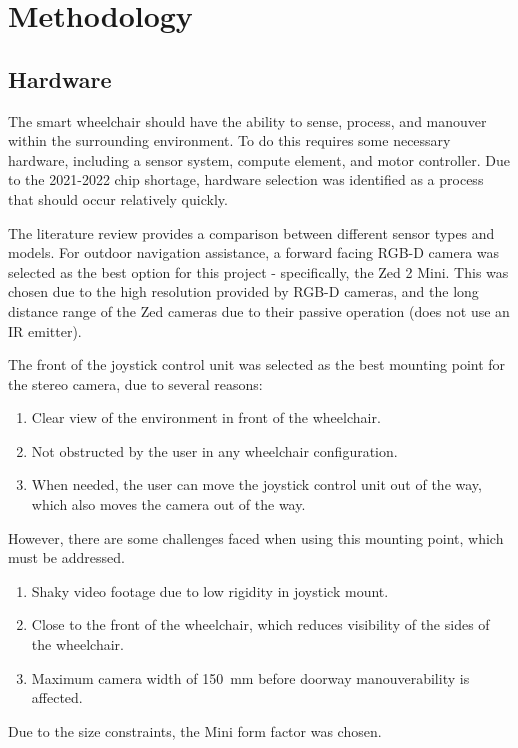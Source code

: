 \documentclass[12pt]{article}
\begin{document}

\pagebreak





\section{Methodology}

\subsection{Hardware}
The smart wheelchair should have the ability to sense, process, and manouver within the surrounding environment.
To do this requires some necessary hardware, including a sensor system, compute element, and motor controller.
Due to the 2021-2022 chip shortage, hardware selection was identified as a process that should occur relatively quickly.

The literature review provides a comparison between different sensor types and models. For outdoor navigation assistance,
a forward facing RGB-D camera was selected as the best option for this project - specifically, the Zed 2 Mini.
This was chosen due to the high resolution provided by RGB-D cameras, and the long distance range of the Zed cameras due to 
their passive operation (does not use an IR emitter).

The front of the joystick control unit was selected as the best mounting point for the
stereo camera, due to several reasons:
\begin{enumerate}
    \itemsep=0em
    \item Clear view of the environment in front of the wheelchair.
    \item Not obstructed by the user in any wheelchair configuration.
    \item When needed, the user can move the joystick control unit out of the way,
            which also moves the camera out of the way.
\end{enumerate}
However, there are some challenges faced when using this mounting point, which must be addressed.
\begin{enumerate}
    \itemsep=0em
    \item Shaky video footage due to low rigidity in joystick mount.
    \item Close to the front of the wheelchair, which reduces visibility of the sides of the wheelchair.
    \item Maximum camera width of \SI{150}{\milli\metre} before doorway manouverability is affected.
\end{enumerate}
Due to the size constraints, the Mini form factor was chosen.
\end{document}
